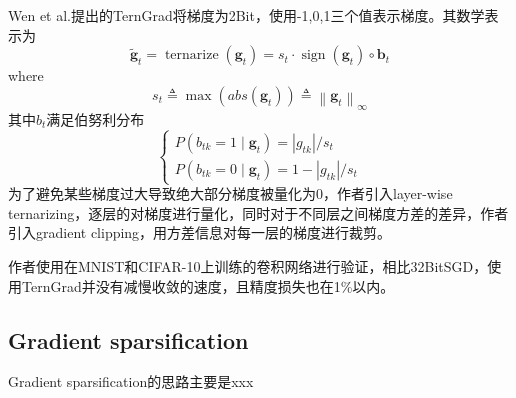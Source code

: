 \documentclass[10pt,onecolumn,letterpaper]{article}
\begin{document}
    Wen et al.\cite{Wen}提出的TernGrad将梯度为2Bit，使用-1,0,1三个值表示梯度。其数学表示为
    \[
        \tilde{\boldsymbol{g}}_{t}=\operatorname{ternarize}\left(\boldsymbol{g}_{t}\right)=s_{t} \cdot \operatorname{sign}\left(\boldsymbol{g}_{t}\right) \circ \boldsymbol{b}_{t}
    \]
    where
    \[
        s_{t} \triangleq \max \left(a b s\left(\boldsymbol{g}_{t}\right)\right) \triangleq\left\|\boldsymbol{g}_{t}\right\|_{\infty}
    \]
    其中$b_t$满足伯努利分布
    \[
        \left\{\begin{array}{l}
        P\left(b_{t k}=1 \mid \boldsymbol{g}_{t}\right)=\left|g_{t k}\right| / s_{t} \\
        P\left(b_{t k}=0 \mid \boldsymbol{g}_{t}\right)=1-\left|g_{t k}\right| / s_{t}
        \end{array}\right.
    \]
    为了避免某些梯度过大导致绝大部分梯度被量化为0，作者引入layer-wise ternarizing，逐层的对梯度进行量化，同时对于不同层之间梯度方差的差异，作者引入gradient clipping，用方差信息对每一层的梯度进行裁剪。

    作者使用在MNIST和CIFAR-10上训练的卷积网络进行验证，相比32BitSGD，使用TernGrad并没有减慢收敛的速度，且精度损失也在1\%以内。

    \subsection{Gradient sparsification}
    Gradient sparsification的思路主要是xxx
    \cite{}
    \cite{Lin2017}


    {\small
         
        
    }
\end{document}
